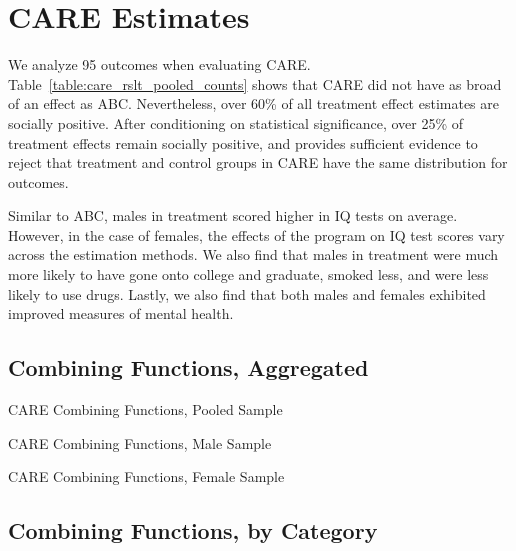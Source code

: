 \section{CARE Estimates}

We analyze 95 outcomes when evaluating CARE. Table~\ref{table:care_rslt_pooled_counts} shows that CARE did not have as broad of an effect as ABC. Nevertheless, over 60\% of all treatment effect estimates are socially positive. After conditioning on statistical significance, over 25\% of treatment effects remain socially positive, and provides sufficient evidence to reject that treatment and control groups in CARE have the same distribution for outcomes.

Similar to ABC, males in treatment scored higher in IQ tests on average. However, in the case of females, the effects of the program on IQ test scores vary across the estimation methods. We also find that males in treatment were much more likely to have gone onto college and graduate, smoked less, and were less likely to use drugs. Lastly, we also find that both males and females exhibited improved measures of mental health.

\def\arraystretch{0.6}

\setlength\tabcolsep{0.3em}

\subsection{{Combining Functions, Aggregated}}


	\begin{table}[H]
     \caption{CARE Combining Functions, Pooled Sample}
     \label{table:care_rslt_pooled_counts} 
	
	\end{table}  

	\begin{table}[H]
     \caption{CARE Combining Functions, Male Sample} 
	
	\end{table}  

	\begin{table}[H]
     \caption{CARE Combining Functions, Female Sample} 
	
	\end{table}  
\clearpage

\subsection{{Combining Functions, by Category}}


